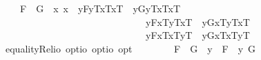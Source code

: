 \begin{isabellebody}
\ \ \ \ {\isachardoublequoteopen}F{}\ \isactrlbold {\isacharequal}\ G{}\ {\isasymequiv}\ \isactrlbold {\isasymforall}x{}\ x{}{\isachardot}{\isacharparenleft}\ \ {\isacharparenleft}\isactrlbold {\isasymlambda}y{\isachardot}{\isasymlparr}F{}{\isacharcomma}y\isactrlsup T{\isacharcomma}x{}\isactrlsup T{\isacharcomma}x{}\isactrlsup T{\isasymrparr}{\isacharparenright}\ \isactrlbold {\isacharequal}\ {\isacharparenleft}\isactrlbold {\isasymlambda}y{\isachardot}{\isasymlparr}G{}{\isacharcomma}y\isactrlsup T{\isacharcomma}x{}\isactrlsup T{\isacharcomma}x{}\isactrlsup T{\isasymrparr}{\isacharparenright}\isanewline
\ \ \ \ \ \ \ \ \ \ \ \ \ \ \ \ \ \ \ \ \ \ \ \ \ \ \ \ \ \isactrlbold {\isasymand}\ {\isacharparenleft}\isactrlbold {\isasymlambda}y{\isachardot}{\isasymlparr}F{}{\isacharcomma}x{}\isactrlsup T{\isacharcomma}y\isactrlsup T{\isacharcomma}x{}\isactrlsup T{\isasymrparr}{\isacharparenright}\ \isactrlbold {\isacharequal}\ {\isacharparenleft}\isactrlbold {\isasymlambda}y{\isachardot}{\isasymlparr}G{}{\isacharcomma}x{}\isactrlsup T{\isacharcomma}y\isactrlsup T{\isacharcomma}x{}\isactrlsup T{\isasymrparr}{\isacharparenright}\isanewline
\ \ \ \ \ \ \ \ \ \ \ \ \ \ \ \ \ \ \ \ \ \ \ \ \ \ \ \ \ \isactrlbold {\isasymand}\ {\isacharparenleft}\isactrlbold {\isasymlambda}y{\isachardot}{\isasymlparr}F{}{\isacharcomma}x{}\isactrlsup T{\isacharcomma}x{}\isactrlsup T{\isacharcomma}y\isactrlsup T{\isasymrparr}{\isacharparenright}\ \isactrlbold {\isacharequal}\ {\isacharparenleft}\isactrlbold {\isasymlambda}y{\isachardot}{\isasymlparr}G{}{\isacharcomma}x{}\isactrlsup T{\isacharcomma}x{}\isactrlsup T{\isacharcomma}y\isactrlsup T{\isasymrparr}{\isacharparenright}{\isacharparenright}{\isachardoublequoteclose}\isanewline
\isanewline
\ \isamarkupfalse%
\ equalityRel{}{\isacharcolon}{\isacharcolon}{\isachardoublequoteopen}io\ opt{\isasymRightarrow}io\ opt{\isasymRightarrow}io\ opt{\isachardoublequoteclose}\ {\isacharparenleft}\ {\isachardoublequoteopen}\isactrlbold {\isacharequal}\ {}{}{\isacharparenright}\ \isanewline
\ \ \ \ {\isachardoublequoteopen}F{}\ \isactrlbold {\isacharequal}\ G{}\ {\isasymequiv}\ {\isacharparenleft}\isactrlbold {\isasymlambda}y\ {\isachardot}\ F{}{\isacharparenright}\ \isactrlbold {\isacharequal}\ {\isacharparenleft}\isactrlbold {\isasymlambda}y{\isachardot}\ G{}{\isacharparenright}{\isachardoublequoteclose}%

\end{isabellebody}
